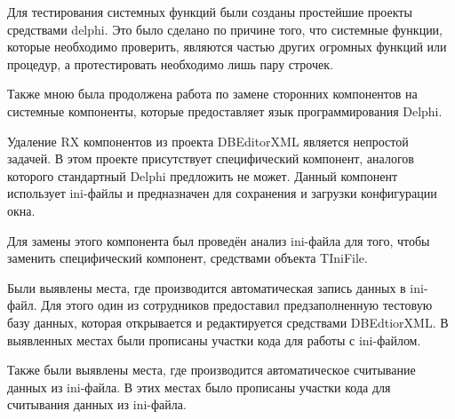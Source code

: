 {    \par \redline Для тестирования системных функций были созданы простейшие проекты средствами delphi. Это было сделано по причине того, что системные функции, которые необходимо проверить, являются частью других огромных функций или процедур, а протестировать необходимо лишь пару строчек. 

    \par \redline Также мною была продолжена работа по замене сторонних компонентов на системные компоненты, которые предоставляет язык программирования Delphi. 

    \par \redline Удаление RX компонентов из проекта DBEditorXML является непростой задачей. В этом проекте присутствует специфический компонент, аналогов которого стандартный Delphi предложить не может. Данный компонент использует ini-файлы и предназначен для сохранения и загрузки конфигурации окна. 

    \par \redline Для замены этого компонента был проведён анализ ini-файла для того, чтобы заменить специфический компонент, средствами объекта TIniFile.   

    \par \redline Были выявлены места, где производится автоматическая запись данных в ini-файл. Для этого один из сотрудников предоставил предзаполненную тестовую базу данных, которая открывается и редактируется средствами DBEdtiorXML. В выявленных местах были прописаны участки кода для работы с ini-файлом. 

    \par \redline Также были выявлены места, где производится автоматическое считывание данных из ini-файла. В этих местах было прописаны участки кода для считывания данных из ini-файла.

    \par
}